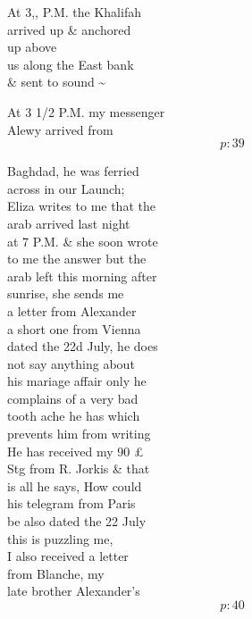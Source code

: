 \documentclass{report}
\begin{document}
	\par{
 	At 3,, P.M. the Khalifah\ \\arrived up \& anchored\ \\up above\ \\us along the East bank\ \\\& sent to sound \~{}\ \\
	}

	\par{
 	At 3 1/2 P.M. my messenger\ \\Alewy arrived from\ \\
  \[p: 39 \]

	}


	\par{
 	Baghdad, he was ferried\ \\across in our Launch;\ \\Eliza writes to me that the\ \\arab arrived last night\ \\at 7 P.M. \& she soon wrote\ \\to me the answer but the\ \\arab left this morning after\ \\sunrise, she sends me\ \\a letter from Alexander\ \\a short one from Vienna\ \\dated the 22d July, he does\ \\not say anything about\ \\his mariage affair only he\ \\complains of a very bad\ \\tooth ache he has which\ \\prevents him from writing\ \\He has received my 90 £\ \\Stg from R. Jorkis \& that\ \\is all he says, How could\ \\his telegram from Paris\ \\be also dated the 22 July\ \\this is puzzling me,\ \\I also received a letter\ \\from Blanche, my\ \\late brother Alexander's\ \\
  \[p: 40 \]

	}

\end{document}
